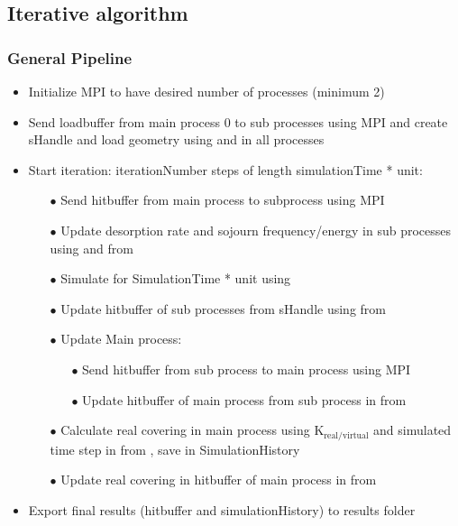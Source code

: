 \newpage
\subsection{Iterative algorithm}
\subsubsection{General Pipeline}
\begin{itemize}[noitemsep,topsep=0pt]
\item Initialize MPI to have desired number of processes (minimum 2)
\item Send loadbuffer from main process 0 to sub processes using MPI and create sHandle and load geometry using  and  in all processes
\item Start iteration: iterationNumber steps of length simulationTime * unit:
	\begin{itemize}[noitemsep,topsep=0pt]
	\item[$\bullet$] Send hitbuffer from main process to subprocess using MPI
	\item[$\bullet$] Update desorption rate and sojourn frequency/energy in sub processes using  and  from 
	\item[$\bullet$] Simulate for SimulationTime * unit using 
	\item[$\bullet$] Update hitbuffer of sub processes from sHandle using  from 
	\item[$\bullet$] Update Main process:
		\begin{itemize}[noitemsep,topsep=0pt]
		\item[$\bullet$] Send hitbuffer from sub process to main process using MPI
		\item[$\bullet$] Update hitbuffer of main process from sub process in  from 
		\end{itemize}
	\item[$\bullet$] Calculate real covering in main process using $\text{K}_{\text{real}/\text{virtual}}$ and simulated time step in  from , save in SimulationHistory
	\item[$\bullet$] Update real covering in hitbuffer of main process in  from 
	\end{itemize}
\item Export final results (hitbuffer and simulationHistory) to results folder
\end{itemize}

